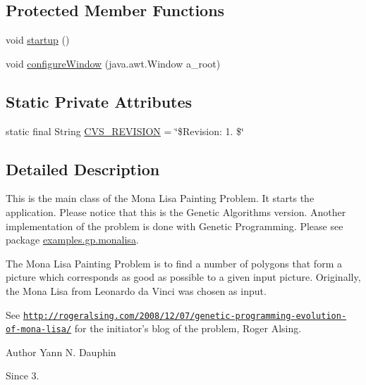 \subsection*{Protected Member Functions}
\begin{DoxyCompactItemize}
\item 
void \hyperlink{classexamples_1_1monalisa_1_1gui_1_1_genetic_drawing_app_acadc12613ae7f3c5427bfa9952876bb7}{startup} ()
\item 
void \hyperlink{classexamples_1_1monalisa_1_1gui_1_1_genetic_drawing_app_a9f5dbefe6534ffefc71d31aa0b3549ce}{configure\-Window} (java.\-awt.\-Window a\-\_\-root)
\end{DoxyCompactItemize}
\subsection*{Static Private Attributes}
\begin{DoxyCompactItemize}
\item 
static final String \hyperlink{classexamples_1_1monalisa_1_1gui_1_1_genetic_drawing_app_a77ae46008d5b77f165d58b1e9cd2ef73}{C\-V\-S\-\_\-\-R\-E\-V\-I\-S\-I\-O\-N} = \char`\"{}\$Revision\-: 1. \$\char`\"{}
\end{DoxyCompactItemize}


\subsection{Detailed Description}
This is the main class of the Mona Lisa Painting Problem. It starts the application. Please notice that this is the Genetic Algorithms version. Another implementation of the problem is done with Genetic Programming. Please see package \hyperlink{namespaceexamples_1_1gp_1_1monalisa}{examples.\-gp.\-monalisa}.

The Mona Lisa Painting Problem is to find a number of polygons that form a picture which corresponds as good as possible to a given input picture. Originally, the Mona Lisa from Leonardo da Vinci was chosen as input.

See \href{http://rogeralsing.com/2008/12/07/genetic-programming-evolution-of-mona-lisa/}{\tt http\-://rogeralsing.\-com/2008/12/07/genetic-\/programming-\/evolution-\/of-\/mona-\/lisa/} for the initiator's blog of the problem, Roger Alsing.

\begin{DoxyAuthor}{Author}
Yann N. Dauphin 
\end{DoxyAuthor}
\begin{DoxySince}{Since}
3. 
\end{DoxySince}


